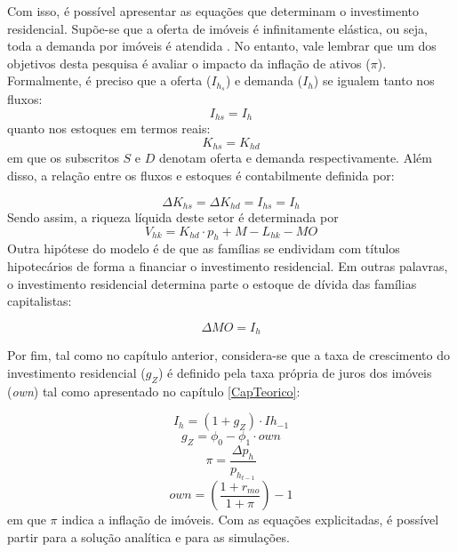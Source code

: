 Com isso, é possível apresentar as equações que determinam o investimento residencial. Supõe-se que a oferta de imóveis é infinitamente elástica, ou seja, toda a demanda por imóveis é atendida \cite[p.~141--145]{duesenberry_investment_1958}. No entanto, vale lembrar que um dos objetivos desta pesquisa é avaliar o impacto da inflação de ativos ($\pi$). Formalmente, é preciso que a oferta ($I_{h_s}$) e demanda ($I_h$) se igualem tanto nos fluxos:
\begin{equation}
    I_{hs} = I_h
\end{equation}
quanto nos estoques em termos reais:
\begin{equation}
    K_{hs} = K_{hd}
\end{equation}
em que os subscritos $S$ e $D$ denotam oferta e demanda respectivamente. Além disso, a relação entre os fluxos e estoques é contabilmente definida por:

\begin{equation}
    \Delta K_{hs} = \Delta K_{hd} = I_{hs} = I_h
\end{equation}
Sendo assim, a riqueza líquida deste setor é determinada por
\begin{equation}
V_{hk} = K_{hd}\cdot p_h + M - L_{hk} - MO
\end{equation}
Outra hipótese do modelo é de que as famílias se endividam com títulos hipotecários de forma a financiar o investimento residencial. Em outras palavras, o investimento residencial determina parte o estoque de dívida das famílias capitalistas:

\begin{equation}
    \label{EqMO}
    \Delta MO = I_h
\end{equation}

Por fim, tal como no capítulo anterior, considera-se que a taxa de crescimento do investimento residencial ($g_Z$) é definido pela taxa própria de juros dos imóveis (\textit{own}) tal como apresentado no capítulo \ref{CapTeorico}:

\begin{equation}
    I_h = (1 + g_Z)\cdot Ih_{-1}
\end{equation}
\begin{equation}
g_Z = \phi_0 - \phi_1\cdot own
\end{equation}
$$
\pi = \frac{\Delta p_h}{p_{h_{t-1}}}
$$
\begin{equation}
own = \left(\frac{1+r_{mo}}{1+\pi}\right) -1
\end{equation}
em que $\pi$ indica a inflação de imóveis. 
Com as equações explicitadas, é possível partir para a solução analítica e para as simulações. 